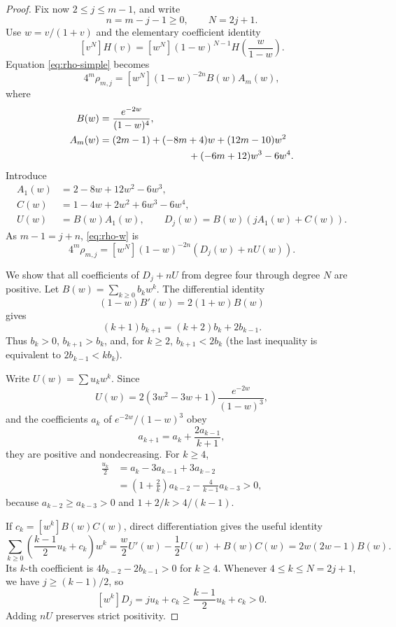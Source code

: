 \documentclass[11pt]{article}
\begin{document}
\begin{proof}
Fix now \(2\leq j\leq m-1\), and write
\[
 n=m-j-1\geq0,\qquad N=2j+1.
\]
Use \(w=v/(1+v)\) and the elementary coefficient identity
\[
 [v^N]H(v)=[w^N](1-w)^{N-1}H\!\left(\frac{w}{1-w}\right).
\]
Equation \eqref{eq:rho-simple} becomes
\begin{equation}\label{eq:rho-w}
 4^m\rho_{m,j}=[w^N](1-w)^{-2n}B(w)A_m(w),
\end{equation}
where
\begin{align*}
 B(w)&=\frac{e^{-2w}}{(1-w)^4},\\
 A_m(w)&=(2m-1)+(-8m+4)w+(12m-10)w^2\\
 &\hspace{3.2cm}+(-6m+12)w^3-6w^4.
\end{align*}
Introduce
\begin{align*}
 A_1(w)&=2-8w+12w^2-6w^3,\\
 C(w)&=1-4w+2w^2+6w^3-6w^4,\\
 U(w)&=B(w)A_1(w),\qquad D_j(w)=B(w)(jA_1(w)+C(w)).
\end{align*}
As \(m-1=j+n\), \eqref{eq:rho-w} is
\begin{equation}\label{eq:conv}
 4^m\rho_{m,j}=[w^N](1-w)^{-2n}(D_j(w)+nU(w)).
\end{equation}

We show that all coefficients of \(D_j+nU\) from degree four through
degree \(N\) are positive.  Let
\(B(w)=\sum_{k\geq0}b_kw^k\).  The differential identity
\[
 (1-w)B'(w)=2(1+w)B(w)
\]
gives
\[
 (k+1)b_{k+1}=(k+2)b_k+2b_{k-1}.
\]
Thus \(b_k>0\), \(b_{k+1}>b_k\), and, for \(k\geq2\),
\(b_{k+1}<2b_k\) (the last inequality is equivalent to
\(2b_{k-1}<kb_k\)).

Write \(U(w)=\sum u_kw^k\).  Since
\[
 U(w)=2(3w^2-3w+1)\frac{e^{-2w}}{(1-w)^3},
\]
and the coefficients \(a_k\) of \(e^{-2w}/(1-w)^3\) obey
\[
 a_{k+1}=a_k+\frac{2a_{k-1}}{k+1},
\]
they are positive and nondecreasing.  For \(k\geq4\),
\begin{align*}
 \frac{u_k}{2}
 &=a_k-3a_{k-1}+3a_{k-2}\\
 &=\left(1+\frac2k\right)a_{k-2}
      -\frac4{k-1}a_{k-3}>0,
\end{align*}
because \(a_{k-2}\geq a_{k-3}>0\) and
\(1+2/k>4/(k-1)\).

If \(c_k=[w^k]B(w)C(w)\), direct differentiation gives the useful
identity
\begin{equation}\label{eq:V}
 \sum_{k\geq0}\left(\frac{k-1}{2}u_k+c_k\right)w^k
 =\frac w2U'(w)-\frac12U(w)+B(w)C(w)
 =2w(2w-1)B(w).
\end{equation}
Its \(k\)-th coefficient is
\(4b_{k-2}-2b_{k-1}>0\) for \(k\geq4\).  Whenever
\(4\leq k\leq N=2j+1\), we have \(j\geq(k-1)/2\), so
\[
 [w^k]D_j
 =ju_k+c_k
 \geq \frac{k-1}{2}u_k+c_k>0.
\]
Adding \(nU\) preserves strict positivity.


\end{proof}
\end{document}
